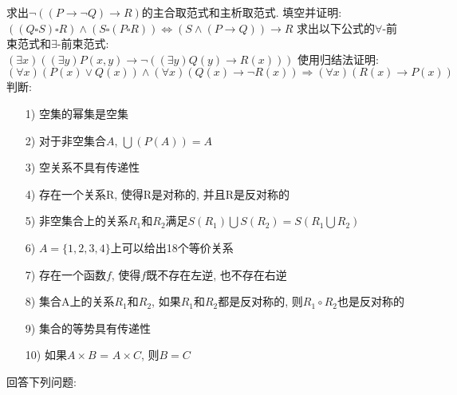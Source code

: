 \documentclass{exam}
\begin{document}
\begin{questions}
    \question[4]求出$\neg ((P \rightarrow \neg Q)\rightarrow R)$的主合取范式和主析取范式.
    \question[8]填空并证明: $((Q \square S) \square R) \land (S \square (P \square R)) \Leftrightarrow (S \land (P \rightarrow Q)) \rightarrow R$
    \question[8]求出以下公式的$\forall$-前束范式和$\exists$-前束范式: \\
    $(\exists x)((\exists y)P(x, y) \rightarrow \neg((\exists y)Q(y) \rightarrow R(x)))$
    \question[6]使用归结法证明: \\
    $(\forall x)(P(x) \lor Q(x)) \land (\forall x)(Q(x) \rightarrow \neg R(x)) \Rightarrow (\forall x)(R(x) \rightarrow P(x))$
    \question[10]判断: 
    \begin{enumerate}
        \item[1)] 空集的幂集是空集
        \item[2)] 对于非空集合$A$, $\bigcup (P(A))=A$
        \item[3)] 空关系不具有传递性
        \item[4)] 存在一个关系R, 使得R是对称的, 并且R是反对称的
        \item[5)] 非空集合上的关系$R_1$和$R_2$满足$S(R_1) \bigcup S(R_2)=S(R_1 \bigcup R_2)$
        \item[6)] $A=\{1, 2, 3, 4\}$上可以给出18个等价关系
        \item[7)] 存在一个函数$f$, 使得$f$既不存在左逆, 也不存在右逆
        \item[8)] 集合A上的关系$R_1$和$R_2$, 如果$R_1$和$R_2$都是反对称的, 则$R_1 \circ R_2$也是反对称的
        \item[9)] 集合的等势具有传递性
        \item[10)] 如果$A \times B$ = $A \times C$, 则$B=C$
    \end{enumerate}
    \question[10]回答下列问题: 
    \begin{parts}

\end{parts}
\end{questions}
\end{document}
